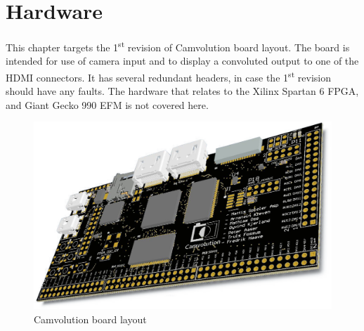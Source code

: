 \section{Hardware}
This chapter targets the 1\textsuperscript{st} revision of Camvolution board layout. The board is intended for use of camera input and to display a convoluted output to one of the HDMI connectors. It has several redundant headers, in case the 1\textsuperscript{st} revision should have any faults. The hardware that relates to the Xilinx Spartan 6 FPGA, and Giant Gecko 990 EFM is not covered here.

\begin{figure}
    \includegraphics[width=\linewidth]{img/OverviewCamvolutionKit}
    \caption{Camvolution board layout}
    \label{fig:board_layout}
\end{figure}

